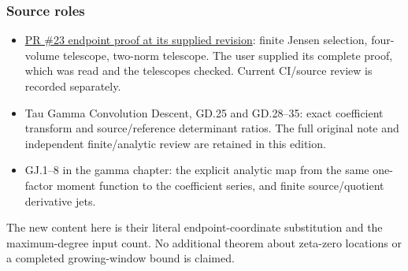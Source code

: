 \subsubsection{Source roles}\label{endpoint-eg_original--source-roles}

\begin{itemize}
\tightlist
\item
  \href{https://github.com/KokunoYumeto/zeta-function-research-reader/blob/c720f40530eed2f5969dbabe94dfd3fddc0f507f/workbenches/tau-toda-volume-formal/ENDPOINT_CRITERION.md}{PR \#23 endpoint proof at its supplied revision}: finite Jensen selection, four-volume telescope, two-norm telescope. The user supplied its complete proof, which was read and the telescopes checked. Current CI/source review is recorded separately.
\item
  Tau Gamma Convolution Descent, GD.25 and GD.28--35: exact coefficient transform and source/reference determinant ratios. The full original note and independent finite/analytic review are retained in this edition.
\item
  GJ.1--8 in the gamma chapter: the explicit analytic map from the same one-factor moment function to the coefficient series, and finite source/quotient derivative jets.
\end{itemize}

The new content here is their literal endpoint-coordinate substitution and the maximum-degree input count. No additional theorem about zeta-zero locations or a completed growing-window bound is claimed.
